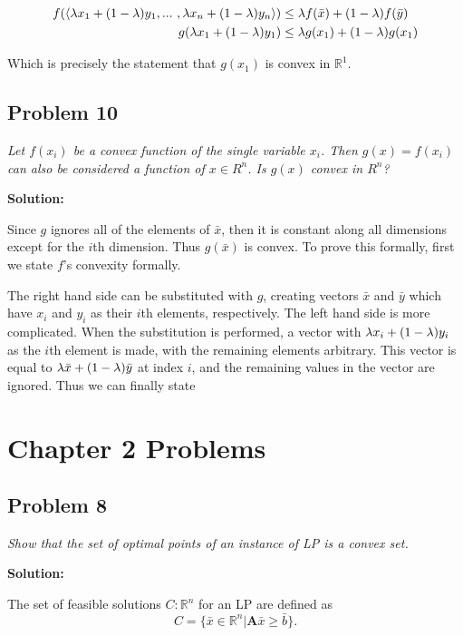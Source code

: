\documentclass[11pt, a4paper]{article}
\newcommand{\solution}{ \noindent \textbf{Solution:}}
\newcommand{\problem}[1]{\textit{#1} \medskip}
\begin{document}
\begin{align}
    f(\vecrange{\la x_1+(1-\la) y_1}{\la x_n+(1-\la) y_n}) &\leq \la f(\x)+(1-\la) f(\y)\\
    g(\la x_1+(1-\la) y_1) &\leq \la g(x_1)+(1-\la) g(x_1)
\end{align}

Which is precisely the statement that $g(x_1)$ is convex in $\mathbb{R}^1$.


\subsection*{Problem 10}

\problem{Let $f(x_i)$ be a convex function of the single variable $x_i$. Then $g(x) = f(x_i)$ can also
be considered a function of $x \in R^n$. Is $g(x)$ convex in $R^n$?}

\solution

Since $g$ ignores all of the elements of $\bar{x}$, then it is constant along all dimensions except
for the $i$th dimension. Thus $g(\bar{x})$ is convex. To prove this formally, first we state $f$'s
convexity formally.

\renewcommand{\x}{x_i}
\renewcommand{\y}{y_i}

The right hand side can be substituted with $g$, creating vectors $\bar{x}$ and $\bar{y}$ which have
$x_i$ and $y_i$ as their $i$th elements, respectively. The left hand side is more complicated.
When the substitution is performed, a vector with $\la \x+(1-\la)\y$ as the $i$th element is made,
with the remaining elements arbitrary. This vector is equal to $\lambda \bar{x} + (1-\lambda)\bar{y}$ at
index $i$, and the remaining values in the vector are ignored. Thus we can finally state

\renewcommand{\x}{\bar{x}}
\renewcommand{\y}{\bar{y}}

\section*{Chapter 2 Problems}

\subsection*{Problem 8}

\problem{Show that the set of optimal points of an instance of LP is a convex set.}

\solution

The set of feasible solutions $C: \mathbb{R}^n$ for an LP are defined as
\begin{equation}
    C=\{\bar{x}\in\mathbb{R}^n | \boldsymbol{A}\bar{x} \geq \bar{b}\}. 
\end{equation}
\end{document}
